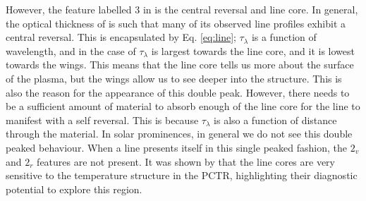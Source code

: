 However, the feature labelled $3$ in  is the central reversal and line core. In general, the optical thickness of \mgiihk{} is such that many of its observed line profiles exhibit a central reversal. This is encapsulated by Eq. \ref{eq:line}; $\tau_\lambda$ is a function of wavelength, and in the case of \mgiihk{} $\tau_\lambda$ is largest towards the line core, and it is lowest towards the wings. This means that the line core tells us more about the surface of the plasma, but the wings allow us to see deeper into the structure. This is also the reason for the appearance of this double peak. However, there needs to be a sufficient amount of material to absorb enough of the line core for the line to manifest with a self reversal. This is because $\tau_\lambda$ is also a function of distance through the material. In solar prominences, in general we do not see this double peaked behaviour. When a line presents itself in this single peaked fashion, the $2_v$ and $2_r$ features are not present. It was shown by \cite{heinzel_formation_2014} that the \mgiihk{} line cores are very sensitive to the temperature structure in the PCTR, highlighting their diagnostic potential to explore this region. 


